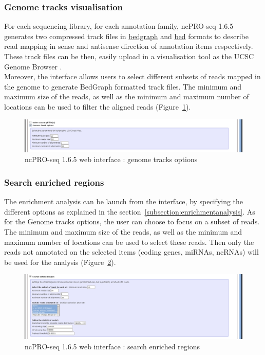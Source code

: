 \documentclass[12pt]{article}
\def \ncpip{ncPRO-seq 1.6.5}
\begin{document}
\subsubsection{Genome tracks visualisation}
For each sequencing library,  for each annotation family, \ncpip{} generates two compressed track files in \href{http://genome.ucsc.edu/goldenPath/help/bedgraph.html}{bedgraph} and \href{http://genome.ucsc.edu/FAQ/FAQformat.html#format1format}{bed} formats to describe read mapping in sense and antisense direction of annotation items respectively. These track files can be then, easily upload in a visualisation tool as the UCSC Genome Browser \cite{Dreszer2012}.\\
Moreover, the interface allows users to select different subsets of reads mapped in the genome to generate BedGraph formatted track files.
The minimum and maximum size of the reads, as well as the minimum and maximum number of locations can be used to filter the aligned reads (Figure~\ref{fig:web6}).
\begin{figure}[!h]
\includegraphics[width=\textwidth]{web_6.png}
\caption{\ncpip{} web interface : genome tracks options}
\label{fig:web6}
\end{figure}
\subsubsection{Search enriched regions}
The enrichment analysis can be launch from the interface, by specifying the different options as explained in the section~\ref{subsection:enrichmentanalysis}.
As for the Genome tracks options, the user can choose to focus on a subset of reads. The minimum and maximum size of the reads, as well as the minimum and maximum number of locations can be used to select these reads. Then only the reads not annotated on the selected items (coding genes, miRNAs, ncRNAs) will be used for the analysis (Figure~\ref{fig:web7}).
\begin{figure}[!h]
\includegraphics[width=\textwidth]{web_7.png}
\caption{\ncpip{} web interface : search enriched regions}
\label{fig:web7}
\end{figure}
\end{document}
